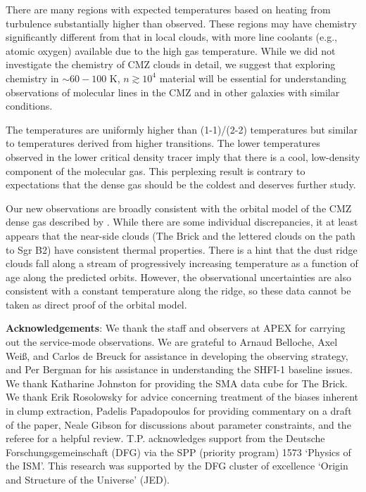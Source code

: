 There are many regions with expected temperatures based on heating from
turbulence substantially higher than observed.  These regions may have
chemistry significantly different from that in local clouds, with more line
coolants (e.g., atomic oxygen) available due to the high gas temperature.
While we did not investigate the chemistry of CMZ clouds in detail, we suggest
that exploring chemistry in $\sim60-100$ K, $n\gtrsim10^4$ \percc material will
be essential for understanding observations of molecular lines in the CMZ and
in other galaxies with similar conditions.  

The \formaldehyde temperatures are uniformly higher than \ammonia (1-1)/(2-2)
temperatures but similar to temperatures derived from higher \ammonia
transitions.  The lower temperatures observed in the lower critical density
tracer imply that there is a cool, low-density component of the molecular gas.
This perplexing result is contrary to expectations that the dense gas should be
the coldest and deserves further study.

Our new observations are broadly consistent with the orbital model of the CMZ
dense gas described by \citet{Kruijssen2015a}.  While there are some individual
discrepancies, it at least appears that the near-side clouds (The Brick and the
lettered clouds on the path to Sgr B2) have consistent thermal properties.
There is a hint that the dust ridge clouds fall along a stream of progressively
increasing temperature as a function of age along the predicted orbits.
However, the observational uncertainties are also consistent with a constant
temperature along the ridge, so these data cannot be taken as direct proof of
the orbital model.


\textbf{Acknowledgements}:
We thank the staff and observers at APEX for carrying out the service-mode
observations.  We are grateful to Arnaud Belloche, Axel Wei{\ss}, and Carlos de
Breuck for assistance in developing the observing strategy, and Per Bergman for
his assistance in understanding the SHFI-1 baseline issues.  We thank Katharine
Johnston for providing the SMA \para \threetwoone data cube for The Brick.  We
thank Erik Rosolowsky for advice concerning treatment of the biases inherent in
clump extraction, Padelis Papadopoulos for providing commentary on a draft of
the paper, Neale Gibson for discussions about parameter constraints, and the
referee for a helpful review.
T.P. acknowledges support from the Deutsche
Forschungsgemeinschaft (DFG) via
the SPP (priority program) 1573 `Physics of the ISM'.
This research was supported by the DFG cluster of excellence `Origin and
Structure of the Universe' (JED).

